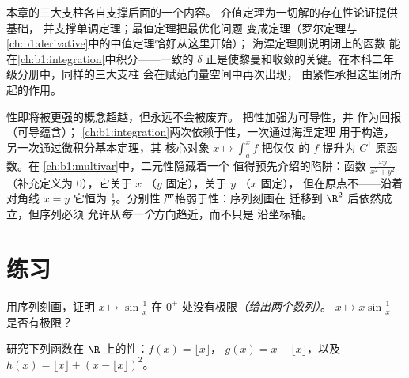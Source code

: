 \begin{remark}[这些定理的后续应用]
本章的三大支柱各自支撑后面的一个内容。
介值定理为一切解的存在性论证提供基础，
并支撑单调定理；最值定理把最优化问题
变成定理（罗尔定理与
\cref{ch:b1:derivative}中的中值定理恰好从这里开始）；
海涅定理则说明闭上的函数
能在\cref{ch:b1:integration}中积分——一致的 $\delta$
正是使黎曼和收敛的关键。在本科二年级分册中，同样的三大支柱
会在赋范向量空间中再次出现，
由紧性承担这里闭所起的作用。
\end{remark}

\begin{remark}[本分册内的展望]
性即将被更强的概念超越，但永远不会被废弃。
把性加强为可导性，并
作为回报（可导蕴含）；
\cref{ch:b1:integration}两次依赖于性，一次通过海涅定理
用于构造，另一次通过微积分基本定理，其
核心对象 $x \mapsto \int_a^x f$ 把仅仅
的 $f$ 提升为 $C^1$ 原函数。在
\cref{ch:b1:multivar}中，二元性隐藏着一个
值得预先介绍的陷阱：函数 $\frac{xy}{x^2 + y^2}$（补充定义为
$0$），它关于 $x$ （$y$ 固定），关于 $y$ （$x$ 固定），
但在原点不——沿着
对角线 $x = y$ 它恒为 $\frac12$。分别性
严格弱于性：序列刻画在
迁移到 $\R^2$ 后依然成立，但序列必须
允许从\emph{每一个}方向趋近，而不只是
沿坐标轴。
\end{remark}

\section{练习}

\begin{exercise}[$\star$]\label{exo:b1:continuity:1}
用序列刻画，证明 $x \mapsto
\sin\frac 1x$ 在 $0^+$ 处没有极限\emph{（给出两个数列）}。
$x \mapsto x \sin\frac 1x$ 是否有极限？
\end{exercise}

\begin{exercise}[$\star$]\label{exo:b1:continuity:2}
研究下列函数在 $\R$ 上的性：$f(x) = \lfloor x \rfloor$，
$g(x) = x - \lfloor x \rfloor$，以及 $h(x) = \lfloor x \rfloor +
(x - \lfloor x\rfloor)^2$。
\end{exercise}

